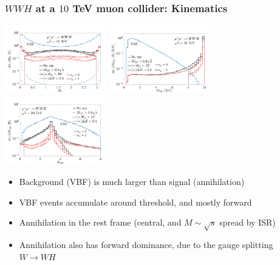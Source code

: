 \documentclass[aspectratio=169]{beamer}
\begin{document}
\begin{frame}
	\frametitle{$WWH$ at a $10$ TeV muon collider: Kinematics}
	\includegraphics[width=0.33\textwidth]{figs/dist/WWH_ThetaB}
	\includegraphics[width=0.33\textwidth]{figs/dist/WWH_M3B}
	\includegraphics[width=0.33\textwidth]{figs/dist/WWH_RBB}

	\begin{itemize}
	\item {\small Background (VBF) is much larger than signal (annihilation)}
	\item {\small VBF events accumulate around threshold, and mostly forward}
	\item {\small Annihilation in the rest frame (central, and $M\sim\sqrt{s}$ spread by ISR)}
	\item {\small Annihilation also has forward dominance, due to the gauge splitting $W\to WH$}
	\end{itemize}
\end{frame}
\end{document}
